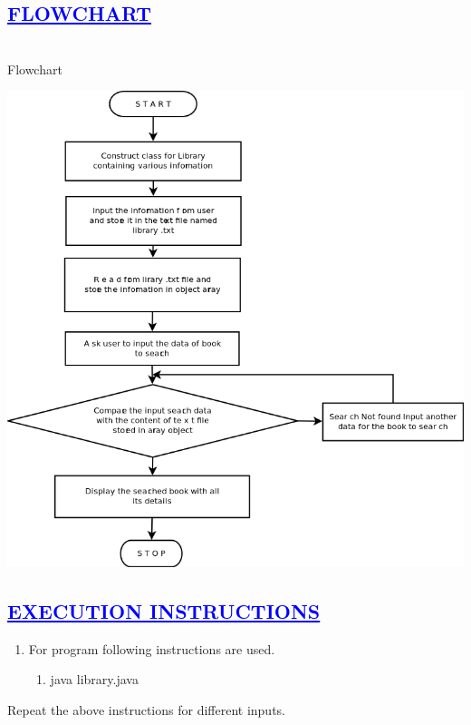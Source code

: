 \documentclass[a4paper,12pt]{report}
\begin{document}
\begin{enumerate}
\begin{enumerate}
\end{enumerate}

\begin{center}
\chapter{\textcolor{blue}{\underline {FLOWCHART}}}
\end{center}
\noindent \\Flowchart
\begin{center}
 \includegraphics[width=12 cm,height=11 cm]{./flowchart.png}
\end{center}

\begin{center}
\chapter{\textcolor{blue}{\underline {EXECUTION INSTRUCTIONS}}}
\end{center}
\begin{enumerate}
 \item For program following instructions are used.
 \begin{enumerate}
  \item java library.java
 \end{enumerate}

\end{enumerate}
Repeat the above instructions for different inputs.


\end{enumerate}
\end{document}
